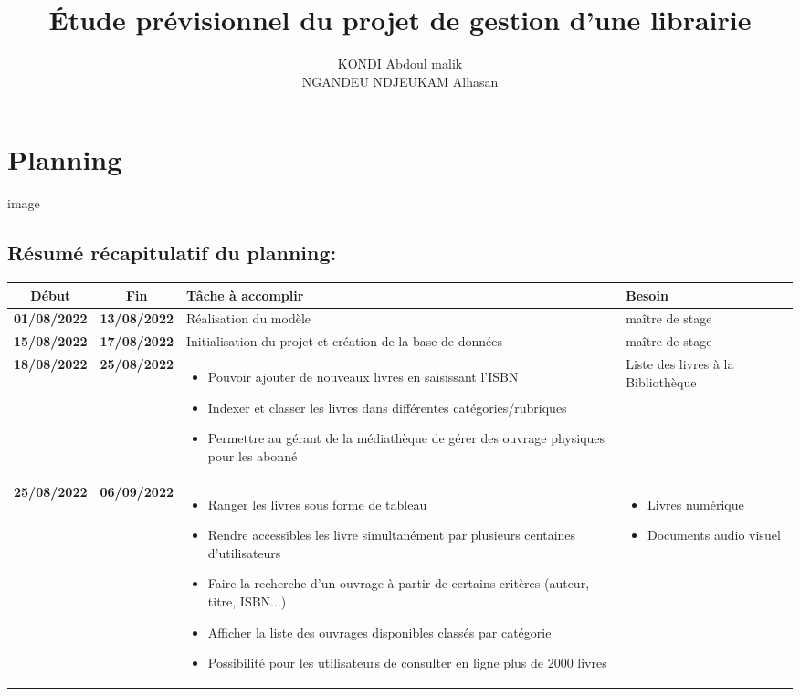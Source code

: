 \documentclass[12pt,a4paper]{article}
\author{KONDI Abdoul malik \\ NGANDEU NDJEUKAM Alhasan}
\title{Étude prévisionnel du projet de gestion d'une librairie}
\begin{document}
\maketitle
\tableofcontents
\newpage

\section{Planning}

image

\subsection{Résumé récapitulatif du planning:}
\begin{center}
\begin{tabular}{|c|c|p{6cm}|p{4cm}|}
\hline 
Début & Fin & Tâche à accomplir & Besoin \\ 
\hline 
\textbf{01/08/2022} & \textbf{13/08/2022} & Réalisation du modèle & maître de stage\\ 
\hline 
\textbf{15/08/2022} & \textbf{17/08/2022} & Initialisation du projet et création de la base de données & maître de stage \\ 
\hline
\textbf{18/08/2022} & \textbf{25/08/2022} & \begin{itemize}
\item[•] Pouvoir ajouter de nouveaux livres en saisissant l’ISBN
\item[•] Indexer et classer les livres dans différentes catégories/rubriques
\item[•] Permettre au gérant de la médiathèque de gérer des ouvrage physiques pour les abonné
\end{itemize} & Liste des livres à la Bibliothèque \\ 
\hline 
\textbf{25/08/2022} & \textbf{06/09/2022} & \begin{itemize}
\item[•] Ranger les livres sous forme de tableau
\item[•] Rendre accessibles les livre simultanément par plusieurs centaines d’utilisateurs
\item[•] Faire la recherche d’un ouvrage à partir de certains critères (auteur, titre, ISBN...)
\item[•] Afficher la liste des ouvrages disponibles classés par catégorie
\item[•] Possibilité pour les utilisateurs de consulter en ligne plus de 2000 livres
\end{itemize} & 
\begin{itemize}
\item[•] Livres numérique
\item[•] Documents audio visuel
\end{itemize} \\
\hline 
\end{tabular} 
\end{center}
\end{document}
